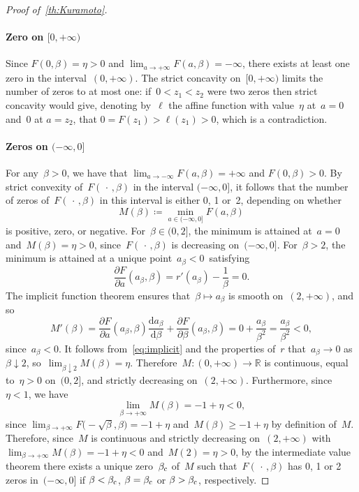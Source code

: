 \documentclass[onefignum,onetabnum]{siamart251216} %
\renewcommand{\d}{\mathrm{d}}
\newcommand{\real}{\mathbb R}
\renewcommand{\geq}{\geqslant}
\theoremstyle{plain}
\numberwithin{equation}{section}
\numberwithin{theorem}{section}
\begin{document}
\begin{proof}[Proof of~{\cref{th:Kuramoto}}]
\paragraph{Zero on $[0, +\infty)$}

Since $F(0,\beta)=\eta>0$ and $\lim_{a\to+\infty}F(a,\beta)=-\infty$,
there exists at least one zero in the interval~$(0, +\infty)$.
The strict concavity on~$[0,+\infty)$ limits the number of zeros to at most one:
if~$0<z_1<z_2$ were two zeros then strict concavity would give,
denoting by~$\ell$ the affine function with value~$\eta$ at~$a=0$ and~0 at $a=z_2$,
that $0=F(z_1) > \ell(z_1) > 0$, which is a contradiction.

\paragraph{Zeros on $(-\infty, 0]$}

For any~$\beta > 0$, we have that $\lim_{a \to - \infty} F(a, \beta) = +\infty$ and $F(0, \beta) > 0$.
By strict convexity of~$F(\,\cdot\,, \beta)$ in the interval $(- \infty, 0]$,
it follows that the number of zeros of~$F(\,\cdot\,, \beta)$ in this interval is either 0, 1 or~2,
depending on whether
\[
    M(\beta) \coloneqq \min_{a \in (-\infty, 0]} F(a, \beta)
\]
is positive, zero, or negative.
For~$\beta \in (0, 2]$, 
the minimum is attained at~$a = 0$ and~$M(\beta) = \eta > 0$,
since~$F(\,\cdot\,, \beta)$ is decreasing on~$(-\infty, 0]$.
For~$\beta > 2$, the minimum is attained at a unique point~$a_\beta < 0$~satisfying
\begin{equation}
    \label{eq:implicit}
    \frac{\partial F}{\partial a}(a_\beta, \beta) = r'(a_\beta) - \frac{1}{\beta} = 0.
\end{equation}
The implicit function theorem ensures that~$\beta \mapsto a_\beta$
is smooth on~$(2,+\infty)$,
and so
\[
    M'(\beta)
    = \frac{\partial F}{\partial a}(a_\beta,\beta)\frac{\d a_\beta}{\d \beta}
    + \frac{\partial F}{\partial \beta}(a_\beta,\beta)
    = 0 + \frac{a_\beta}{\beta^2}
    = \frac{a_\beta}{\beta^2} < 0,
\]
since~$a_\beta < 0$.
It follows from~\eqref{eq:implicit} and the properties of~$r$ that~$a_{\beta} \to 0$ as~$\beta \downarrow 2$,
so~$\lim_{\beta \downarrow 2} M(\beta) = \eta$.
Therefore~$M\colon (0, +\infty) \to \real$ is continuous, equal to~$\eta > 0$ on~$(0,2]$,
and strictly decreasing on~$(2,+\infty)$.
Furthermore, since~$\eta <1$, we have
\[
    \lim_{\beta \to +\infty} M(\beta) = -1 + \eta < 0,
\]
since
\(
    \lim_{\beta \to +\infty} F\bigl(-\sqrt{\beta}, \beta\bigr) = -1 + \eta
\)
and~$M(\beta) \geq -1 + \eta$ by definition of~$M$.
Therefore, since~$M$ is continuous and strictly decreasing on~$(2,+\infty)$ with~$\lim_{\beta \to +\infty} M(\beta) = -1 + \eta < 0$ and~$M(2) = \eta > 0$, by the intermediate value theorem there exists a unique zero~$\beta_{\rm{c}}$ of~$M$
such that~$F(\,\cdot\,, \beta)$ has 0, 1 or 2 zeros in~$(-\infty, 0]$ if
$\beta < \beta_{\rm{c}}$, $\beta = \beta_{\rm{c}}$ or $\beta > \beta_{\rm{c}}$, respectively.


\end{proof}
\end{document}
